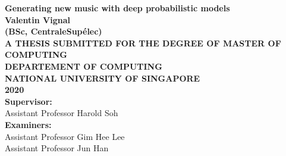 \documentclass[12pt]{report}
\begin{document}
\pagestyle{empty}
\setlength{\parindent}{0cm}
\begin{center}
    {\textbf{\Large Generating new music with deep probabilistic models}}\\
    \vspace{2cm}
    {\textbf{\Large Valentin Vignal}}\\
    \textbf{(BSc, CentraleSupélec)}\\
    \vspace{2cm}
   {\textbf{\Large A THESIS SUBMITTED FOR THE DEGREE OF MASTER OF COMPUTING\\ DEPARTEMENT OF COMPUTING\\ NATIONAL UNIVERSITY OF SINGAPORE\\}}
    \vspace{2.5cm}
    {\textbf{\Large 2020}}\\
    \vspace{2.5cm}
    {\textbf{\large Supervisor:}}\\
    Assistant Professor Harold Soh\\
    {\textbf{\large Examiners:}}\\
    Assistant Professor Gim Hee Lee\\
    Assistant Professor Jun Han
\end{center}
\newpage


% 
%
% 
\end{document}
